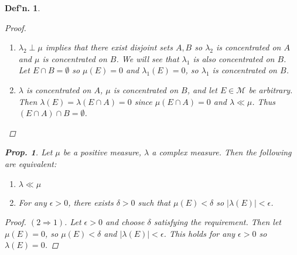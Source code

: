 \documentclass[12pt, a4paper]{book}
\newtheorem{definition}[theorem]{Def'n.}
\newtheorem{proposition}[theorem]{Prop.}
\theoremstyle{nonumberplain}
\newtheorem{proof}{Proof}
\begin{document}
\begin{definition}
\begin{proof}
\begin{enumerate}
            Otherwise, if $\sum|\lambda(E_i)|=0$ for all partitions, then $|\lambda|(E)=0$ so $|\lambda|\ll\mu$.
        \item $\lambda_2\perp\mu$ implies that there exist disjoint sets $A,B$ so $\lambda_2$ is concentrated on $A$ and $\mu$ is concentrated on $B$.
            We will see that $\lambda_1$ is also concentrated on $B$.
            Let $E\cap B=\emptyset$ so $\mu(E)=0$ and $\lambda_1(E)=0$, so $\lambda_1$ is concentrated on $B$.
        \item $\lambda$ is concentrated on $A$, $\mu$ is concentrated on $B$, and let $E\in\mathcal{M}$ be arbitrary.
            Then $\lambda(E)=\lambda(E\cap A)=0$ since $\mu(E\cap A)=0$ and $\lambda\ll\mu$.
            Thus $(E\cap A)\cap B=\emptyset$.
    \end{enumerate}
\end{proof}
\begin{proposition}
    Let $\mu$ be a positive measure, $\lambda$ a complex measure.
    Then the following are equivalent:
    \begin{enumerate}
        \item $\lambda\ll\mu$
        \item For any $\epsilon>0$, there exists $\delta>0$ such that $\mu(E)<\delta$ so $|\lambda(E)|<\epsilon$.
    \end{enumerate}
\end{proposition}
\begin{proof}
    $(2\Rightarrow 1)$.
    Let $\epsilon>0$ and choose $\delta$ satisfying the requirement.
    Then let $\mu(E)=0$, so $\mu(E)<\delta$ and $|\lambda(E)|<\epsilon$.
    This holds for any $\epsilon>0$ so $\lambda(E)=0$.


\end{proof}
\end{definition}
\end{document}

